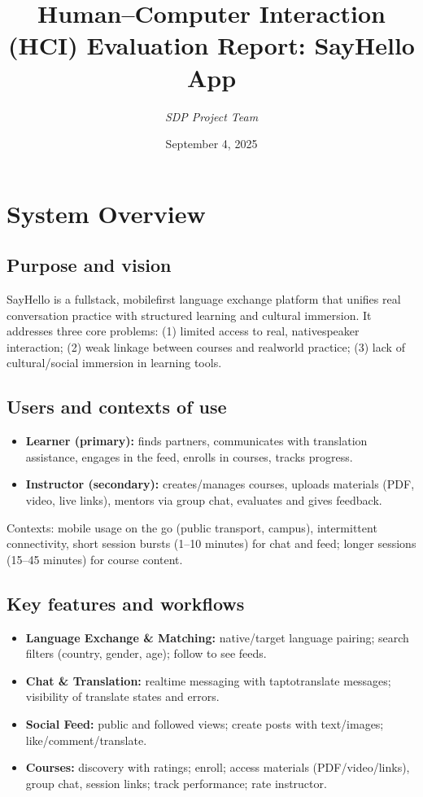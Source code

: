 \documentclass[11pt,a4paper]{article}
\title{Human--Computer Interaction (HCI) Evaluation Report: SayHello App}
\author{\textit{SDP Project Team}}
\date{September 4, 2025}
\begin{document}
\maketitle
\tableofcontents
\newpage
 
\section{System Overview}

\subsection{Purpose and vision}
SayHello is a full\-stack, mobile\-first language exchange platform that unifies real conversation practice with structured learning and cultural immersion. It addresses three core problems: (1) limited access to real, native\-speaker interaction; (2) weak linkage between courses and real\-world practice; (3) lack of cultural/social immersion in learning tools.

\subsection{Users and contexts of use}
\begin{itemize}[leftmargin=*]
  \item \textbf{Learner (primary):} finds partners, communicates with translation assistance, engages in the feed, enrolls in courses, tracks progress.
  \item \textbf{Instructor (secondary):} creates/manages courses, uploads materials (PDF, video, live links), mentors via group chat, evaluates and gives feedback.
\end{itemize}

\noindent Contexts: mobile usage on the go (public transport, campus), intermittent connectivity, short session bursts (1--10 minutes) for chat and feed; longer sessions (15--45 minutes) for course content.

\subsection{Key features and workflows}
\begin{itemize}[leftmargin=*]
  \item \textbf{Language Exchange \& Matching:} native/target language pairing; search filters (country, gender, age); follow to see feeds.
  \item \textbf{Chat \& Translation:} real\-time messaging with tap\-to\-translate messages; visibility of translate states and errors.
  \item \textbf{Social Feed:} public and followed views; create posts with text/images; like/comment/translate.
  \item \textbf{Courses:} discovery with ratings; enroll; access materials (PDF/video/links), group chat, session links; track performance; rate instructor.
\end{itemize}
\end{document}

